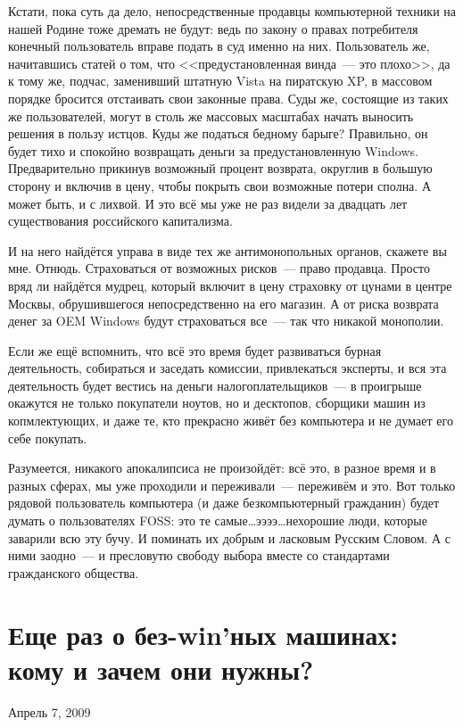 Кстати, пока суть да дело, непосредственные продавцы компьютерной техники на нашей Родине тоже дремать не будут: ведь по закону о правах потребителя конечный пользователь вправе подать в суд именно на них. Пользователь же, начитавшись статей о том, что <<предустановленная винда~--- это плохо>>, да к тому же, подчас, заменивший штатную Vista на пиратскую XP, в массовом порядке бросится отстаивать свои законные права. Суды же, состоящие из таких же пользователей, могут в столь же массовых масштабах начать выносить решения в пользу истцов. Куды же податься бедному барыге? Правильно, он будет тихо и спокойно возвращать деньги за предустановленную Windows. Предварительно прикинув возможный процент возврата, округлив в большую сторону и включив в цену, чтобы покрыть свои возможные потери сполна. А может быть, и с лихвой. И это всё мы уже не раз видели за двадцать лет существования российского капитализма.

И на него найдётся управа в виде тех же антимонопольных органов, скажете вы мне. Отнюдь.  Страховаться от возможных рисков~--- право продавца. Просто вряд ли найдётся мудрец, который включит в цену страховку от цунами в центре Москвы, обрушившегося непосредственно на его магазин. А от риска возврата денег за OEM Windows будут страховаться все~--- так что никакой монополии.

Если же ещё вспомнить, что всё это время будет развиваться бурная деятельность, собираться и заседать комиссии, привлекаться эксперты, и вся эта деятельность будет вестись на деньги налогоплательщиков~--- в проигрыше окажутся не только покупатели ноутов, но и десктопов, сборщики машин из копмлектующих, и даже те, кто прекрасно живёт без компьютера и не думает его себе покупать.

Разумеется, никакого апокалипсиса не произойдёт: всё это, в разное время и в разных сферах,  мы уже проходили и переживали~--- переживём и это. Вот только рядовой пользователь компьютера (и даже безкомпьютерный гражданин) будет думать о пользователях FOSS: это те самые\dots ээээ\dots нехорошие люди, которые заварили всю эту бучу. И поминать их добрым и ласковым Русским Словом. А с ними заодно~--- и пресловутю свободу выбора вместе со стандартами гражданского общества.

\section{Еще раз о без-win’ных машинах: кому и зачем они нужны?} 

\begin{timeline}Апрель 7, 2009\end{timeline}

